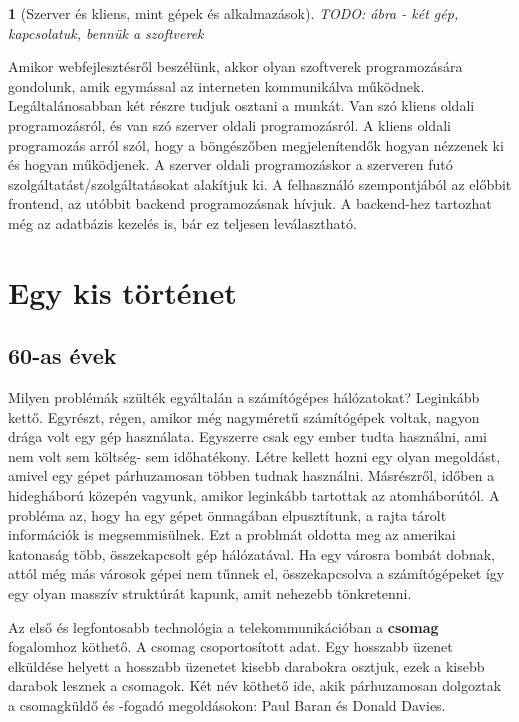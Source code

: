 \documentclass[a4paper, 12pt, oneside]{article}
\newtheorem*{defin}{}
\begin{document}
\begin{center}
\begin{defin}[Szerver és kliens, mint gépek és alkalmazások]
TODO: ábra - két gép, kapcsolatuk, bennük a szoftverek
\end{defin}
\end{center}

Amikor webfejlesztésről beszélünk, akkor olyan szoftverek programozására gondolunk, amik egymással az interneten kommunikálva működnek. Legáltalánosabban két részre tudjuk osztani a munkát. Van szó kliens oldali programozásról, és van szó szerver oldali programozásról. A kliens oldali programozás arról szól, hogy a böngészőben megjelenítendők hogyan nézzenek ki és hogyan működjenek. A szerver oldali programozáskor a szerveren futó szolgáltatást/szolgáltatásokat alakítjuk ki. A felhasználó szempontjából az előbbit frontend, az utóbbit backend programozásnak hívjuk. A backend-hez tartozhat még az adatbázis kezelés is, bár ez teljesen leválasztható.


\section{Egy kis történet}
\subsection*{60-as évek}

Milyen problémák szülték egyáltalán a számítógépes hálózatokat? Leginkább kettő. Egyrészt, régen, amikor még nagyméretű számítógépek voltak, nagyon drága volt egy gép használata. Egyszerre csak egy ember tudta használni, ami nem volt sem költség- sem időhatékony. Létre kellett hozni egy olyan megoldást, amivel egy gépet párhuzamosan többen tudnak használni. Másrészről, időben a hidegháború közepén vagyunk, amikor leginkább tartottak az atomháborútól. A probléma az, hogy ha egy gépet önmagában elpusztítunk, a rajta tárolt információk is megsemmisülnek. Ezt a problmát oldotta meg az amerikai katonaság több, összekapcsolt gép hálózatával. Ha egy városra bombát dobnak, attól még más városok gépei nem tűnnek el, összekapcsolva a számítógépeket így egy olyan masszív struktúrát kapunk, amit nehezebb tönkretenni.
\bigbreak

Az első és legfontosabb technológia a telekommunikációban a \textbf{csomag} fogalomhoz köthető. A csomag csoportosított adat. Egy hosszabb üzenet elküldése helyett a hosszabb üzenetet kisebb darabokra osztjuk, ezek a kisebb darabok lesznek a csomagok. Két név köthető ide, akik párhuzamosan dolgoztak a csomagküldő és -fogadó megoldásokon: Paul Baran és Donald Davies.
\end{document}
